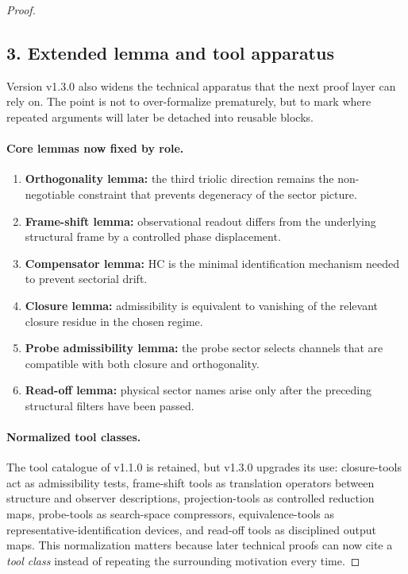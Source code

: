 \begin{proof}
\subsection*{3. Extended lemma and tool apparatus}
Version v1.3.0 also widens the technical apparatus that the next proof
layer can rely on. The point is not to over-formalize prematurely, but to mark
where repeated arguments will later be detached into reusable blocks.

\paragraph{Core lemmas now fixed by role.}
\begin{enumerate}[leftmargin=2em]
  \item \textbf{Orthogonality lemma:} the third triolic direction remains the
  non-negotiable constraint that prevents degeneracy of the sector picture.
  \item \textbf{Frame-shift lemma:} observational readout differs from the
  underlying structural frame by a controlled phase displacement.
  \item \textbf{Compensator lemma:} HC is the minimal identification mechanism
  needed to prevent sectorial drift.
  \item \textbf{Closure lemma:} admissibility is equivalent to vanishing of the
  relevant closure residue in the chosen regime.
  \item \textbf{Probe admissibility lemma:} the probe sector selects channels
  that are compatible with both closure and orthogonality.
  \item \textbf{Read-off lemma:} physical sector names arise only after the
  preceding structural filters have been passed.
\end{enumerate}

\paragraph{Normalized tool classes.}
The tool catalogue of v1.1.0 is retained, but v1.3.0 upgrades its use:
closure-tools act as admissibility tests, frame-shift tools as translation
operators between structure and observer descriptions, projection-tools as
controlled reduction maps, probe-tools as search-space compressors,
equivalence-tools as representative-identification devices, and read-off tools
as disciplined output maps. This normalization matters because later technical
proofs can now cite a \emph{tool class} instead of repeating the surrounding
motivation every time.


\end{proof}
